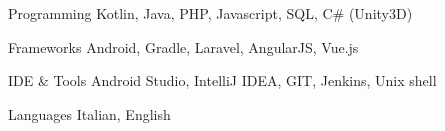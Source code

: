 


\begin{cvskills}


\cvskill
{Programming} %
{Kotlin, Java, PHP, Javascript, SQL, C\# (Unity3D)} %


\cvskill
{Frameworks} %
{Android, Gradle, Laravel, AngularJS, Vue.js} %


\cvskill
{IDE \& Tools} %
{Android Studio, IntelliJ IDEA, GIT, Jenkins, Unix shell} %


\cvskill
{Languages} %
{Italian, English} %


\end{cvskills}